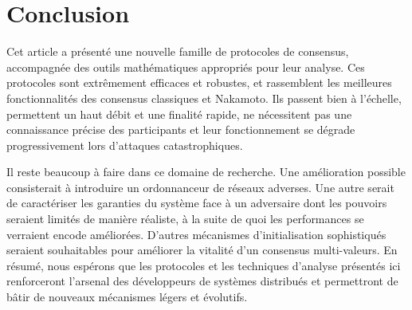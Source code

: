 \documentclass[letterpaper,twocolumn,10pt]{article}
\newcommand{\tronly}[2]{#1}
\theoremstyle{definition}
\begin{document}
\section{Conclusion}
\label{sec:conclusions}
Cet article a présenté une nouvelle famille de protocoles de consensus, accompagnée des outils mathématiques appropriés pour leur analyse.
\tronly{Ces protocoles sont extrêmement efficaces et robustes, et rassemblent les meilleures fonctionnalités des consensus classiques et Nakamoto.}{} 
Ils passent bien à l'échelle, permettent un haut débit et une finalité rapide, ne nécessitent pas une connaissance précise des participants et leur fonctionnement se dégrade progressivement lors d'attaques catastrophiques.

Il reste beaucoup à faire dans ce domaine de recherche. \tronly{
Une amélioration possible consisterait à introduire un ordonnanceur de réseaux adverses. %
Une autre}{Une} serait de caractériser les garanties du système face à un adversaire dont les pouvoirs seraient limités de manière réaliste, à la suite de quoi les performances se verraient encode améliorées. \tronly{D'autres}{Plus} mécanismes d'initialisation sophistiqués seraient souhaitables pour améliorer la vitalité d'un consensus multi-valeurs. 
En résumé, nous espérons que les protocoles et les techniques d'analyse présentés ici renforceront l'arsenal des développeurs de systèmes distribués et permettront de bâtir de nouveaux mécanismes légers et évolutifs.
\end{document}

